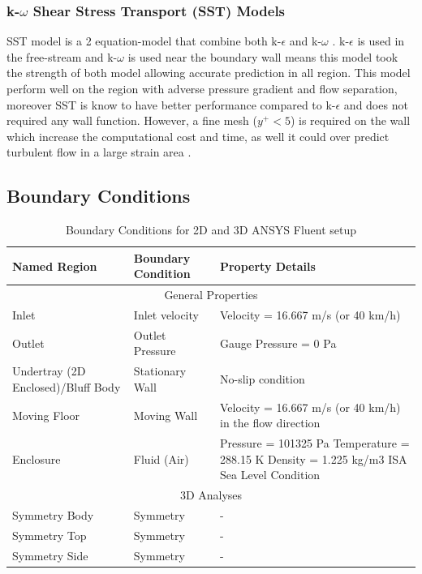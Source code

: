 \subsubsection{k-$\omega$ Shear Stress Transport (SST) Models}
SST model is a 2 equation-model that combine both k-$\epsilon$ and k-$\omega$ \cite{Andersson2011Turbulent-flowModelling}\cite{Ansys2006ModelingFlows}.  k-$\epsilon$ is used in the free-stream and k-$\omega$ is used near the boundary wall means this model took the strength of both model allowing accurate prediction in all region. This model perform well on the region with adverse pressure gradient and  flow separation, moreover SST is know to have better performance compared to k-$\epsilon$ and does not required any wall function\cite{Andersson2011Turbulent-flowModelling}. However, a fine mesh ($y^+  < 5$) is required on the wall which increase the computational cost and time, as well it could over predict turbulent flow in a large strain area \cite{Andersson2011Turbulent-flowModelling}\cite{Ansys2006ModelingFlows}. 



\subsection{Boundary Conditions}
\begin{table}[!htb]
    \centering
    \caption{Boundary Conditions for 2D and 3D ANSYS Fluent setup}
    \label{tab:Boundary Conditions}
    \vspace{-0.5cm}
\begin{center}
\begin{tabular}{||p{4cm}|p{4cm}|p{7cm}||}
 \hline
 \centering
 Named Region & Boundary Condition & Property Details\\
 \hline \hline
 \multicolumn{3}{||c||}{General Properties} \\
 \hline
 
 Inlet & Inlet velocity & Velocity = 16.667 m/s (or 40 km/h)\\
 \hline
 Outlet & Outlet Pressure  & Gauge Pressure = 0 Pa  \\
 \hline
 Undertray (2D Enclosed)/Bluff Body & Stationary Wall & No-slip condition\\
 \hline
 Moving Floor & Moving Wall & Velocity = 16.667 m/s (or 40 km/h) in the flow direction\\
 \hline
 Enclosure &   Fluid (Air)  & Pressure = 101325 Pa
Temperature = 288.15 K
Density = 1.225 kg/m3
ISA Sea Level Condition\\
 
 \hline
 \multicolumn{3}{||c||}{3D Analyses} \\
 \hline
 
 Symmetry Body & Symmetry  & -\\
 \hline
 Symmetry Top & Symmetry  & -\\
 \hline
 Symmetry Side & Symmetry & -\\
 \hline
 
\end{tabular}
\end{center}
\end{table}

